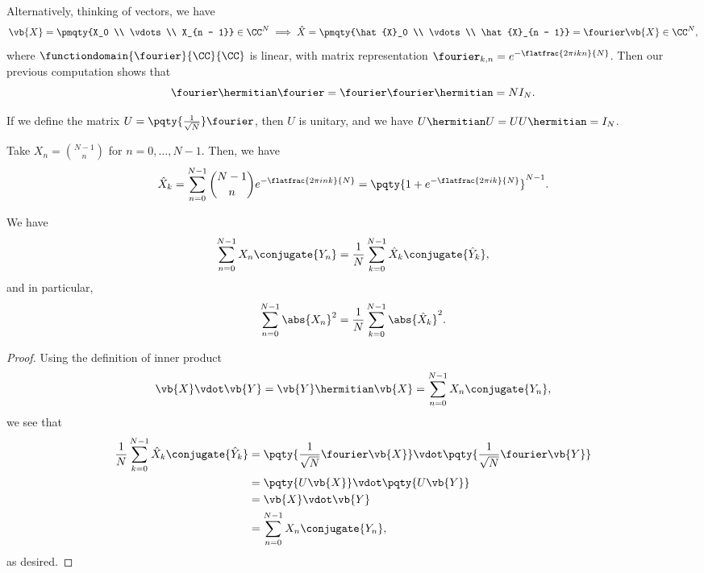 Alternatively, thinking of vectors, we have
\begin{equation}
    \vb{X} = \pmqty{X_0 \\ \vdots \\ X_{n - 1}} \in \CC^N \implies \hat{X} = \pmqty{\hat{X}_0 \\ \vdots \\ \hat{X}_{n - 1}} = \fourier \vb{X} \in \CC^N,
\end{equation}
where \(\functiondomain{\fourier}{\CC}{\CC}\) is linear, with matrix representation \({\fourier}_{k, n} = e^{-\flatfrac{2 \pi i k n}{N}}\). Then our previous computation shows that
\begin{equation}
    \fourier\hermitian \fourier = \fourier \fourier\hermitian = N I_N.
\end{equation}

If we define the matrix \(U = \pqty{\frac{1}{\sqrt{N}}} \fourier\), then \(U\) is unitary, and we have \(U\hermitian U = U U\hermitian = I_N\).

\begin{example}
    Take \(X_n = \binom{N - 1}{n}\) for \(n = 0, \ldots, N - 1\). Then, we have
    \begin{equation}
        \hat{X}_k = \sum_{n = 0}^{N - 1} \binom{N - 1}{n} e^{- \flatfrac{2 \pi i n k}{N}} = \pqty{1 + e^{- \flatfrac{2 \pi i k}{N}}}^{N - 1}.
    \end{equation}
\end{example}

\begin{proposition}
    We have
    \begin{equation}
        \sum_{n = 0}^{N - 1} X_n \conjugate{Y_n} = \frac{1}{N} \sum_{k = 0}^{N - 1} \hat{X}_k \conjugate{\hat{Y}_k},
    \end{equation}
    and in particular,
    \begin{equation}
        \sum_{n = 0}^{N - 1} \abs{X_n}^2 = \frac{1}{N} \sum_{k = 0}^{N - 1} \abs{\hat{X}_k}^2.
    \end{equation}
\end{proposition}

\begin{proof}
    Using the definition of inner product
    \begin{equation}
        \vb{X} \vdot \vb{Y} = \vb{Y} \hermitian \vb{X} = \sum_{n = 0}^{N - 1} X_n \conjugate{Y_n},
    \end{equation}
    we see that
    \begin{subequations}
        \begin{align}
            \frac{1}{N} \sum_{k = 0}^{N - 1} \hat{X}_k \conjugate{\hat{Y}_k} &= \pqty{\frac{1}{\sqrt{N}} \fourier \vb{X}} \vdot \pqty{\frac{1}{\sqrt{N}} \fourier \vb{Y}} \\
            &= \pqty{U \vb{X}} \vdot \pqty{U \vb{Y}} \\
            &= \vb{X} \vdot \vb{Y} \\
            &= \sum_{n = 0}^{N - 1} X_n \conjugate{Y_n},
        \end{align}
    \end{subequations}
    as desired.
\end{proof}

